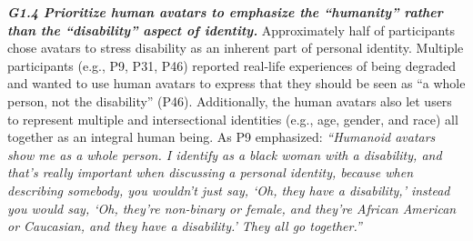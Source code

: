 



\textbf{\textit{G1.4 Prioritize human avatars to emphasize the ``humanity'' rather than the ``disability'' aspect of identity.}}
Approximately half of participants chose  avatars to stress disability as an inherent part of personal identity. Multiple participants (e.g., P9, P31, P46) reported real-life experiences of being degraded and wanted to use human avatars to express that they should be seen as ``a whole person, not the disability'' (P46). Additionally, the human avatars also let users to represent multiple and intersectional identities (e.g., age, gender, and race) all together as an integral human being. As P9 emphasized: \textit{``Humanoid avatars show me as a whole person. I identify as a black woman with a disability, and that's really important when discussing a personal identity, because when describing somebody, you wouldn't just say, ‘Oh, they have a disability,’ instead you would say, ‘Oh, they're non-binary or female, and they're African American or Caucasian, and they have a disability.’ They all go together.''} %

